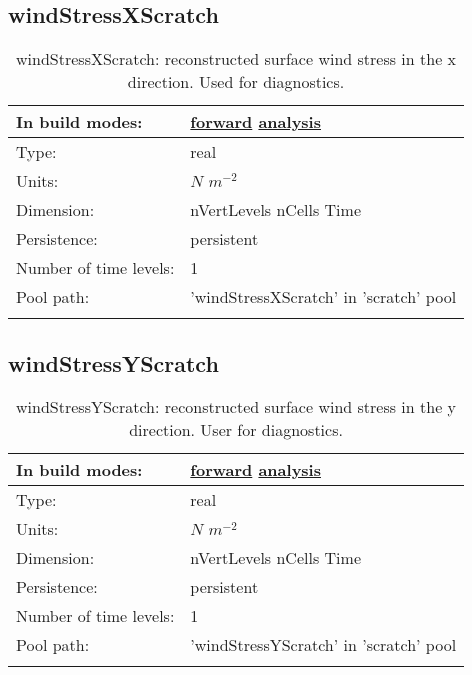 \subsection[windStressXScratch]{windStressXScratch}
\label{subsec:var_sec_scratch_windStressXScratch}
\begin{center}
\begin{longtable}{| p{2.0in} | p{4.0in} |}
        \hline 
        In build modes: & \hyperref[subsec:forward_var_tab_scratch]{forward} \hyperref[subsec:analysis_var_tab_scratch]{analysis} \\
        \hline 
        Type: & real \\
        \hline 
        Units: & $N$ $m^{-2}$ \\
        \hline 
        Dimension: & nVertLevels nCells Time \\
        \hline 
        Persistence: & persistent \\
        \hline 
        Number of time levels: & 1 \\
        \hline 
            Pool path: & 'windStressXScratch' in 'scratch' pool
 \\
		 \hline 
    \caption{windStressXScratch: reconstructed surface wind stress in the x direction. Used for diagnostics.}
\end{longtable}
\end{center}
\subsection[windStressYScratch]{windStressYScratch}
\label{subsec:var_sec_scratch_windStressYScratch}
\begin{center}
\begin{longtable}{| p{2.0in} | p{4.0in} |}
        \hline 
        In build modes: & \hyperref[subsec:forward_var_tab_scratch]{forward} \hyperref[subsec:analysis_var_tab_scratch]{analysis} \\
        \hline 
        Type: & real \\
        \hline 
        Units: & $N$ $m^{-2}$ \\
        \hline 
        Dimension: & nVertLevels nCells Time \\
        \hline 
        Persistence: & persistent \\
        \hline 
        Number of time levels: & 1 \\
        \hline 
            Pool path: & 'windStressYScratch' in 'scratch' pool
 \\
		 \hline 
    \caption{windStressYScratch: reconstructed surface wind stress in the y direction. User for diagnostics.}
\end{longtable}
\end{center}
